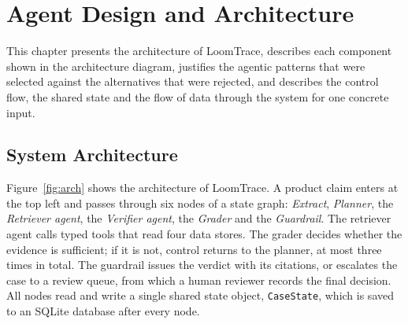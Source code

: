 \chapter{Agent Design and Architecture}

This chapter presents the architecture of LoomTrace, describes each component shown in the
architecture diagram, justifies the agentic patterns that were selected against the alternatives that
were rejected, and describes the control flow, the shared state and the flow of data through the
system for one concrete input.

\section{System Architecture}

Figure~\ref{fig:arch} shows the architecture of LoomTrace. A product claim enters at the top left and
passes through six nodes of a state graph: \emph{Extract}, \emph{Planner}, the \emph{Retriever agent},
the \emph{Verifier agent}, the \emph{Grader} and the \emph{Guardrail}. The retriever agent calls typed
tools that read four data stores. The grader decides whether the evidence is sufficient; if it is not,
control returns to the planner, at most three times in total. The guardrail issues the verdict with its
citations, or escalates the case to a review queue, from which a human reviewer records the final
decision. All nodes read and write a single shared state object, \texttt{CaseState}, which is saved to
an SQLite database after every node.


